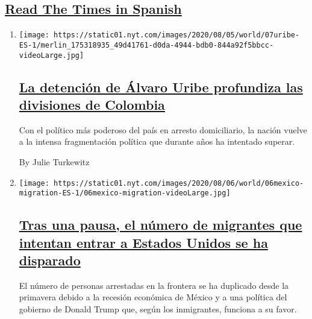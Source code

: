 \hypertarget{read-the-times-in-spanish}{%
\subsection{\texorpdfstring{\protect\hyperlink{}{Read The Times in
Spanish}}{Read The Times in Spanish}}\label{read-the-times-in-spanish}}

\begin{enumerate}
\def\labelenumi{\arabic{enumi}.}
\item
  \texttt{[image: https://static01.nyt.com/images/2020/08/05/world/07uribe-ES-1/merlin\_175318935\_49d41761-d0da-4944-bdb0-844a92f5bbcc-videoLarge.jpg]}

  \hypertarget{la-detenciuxf3n-de-uxe1lvaro-uribe-profundiza-las-divisiones-de-colombia}{%
  \subsection{\texorpdfstring{\href{/es/2020/08/07/espanol/america-latina/alvaro-uribe-colombia.html}{La
  detención de Álvaro Uribe profundiza las divisiones de
  Colombia}}{La detención de Álvaro Uribe profundiza las divisiones de Colombia}}\label{la-detenciuxf3n-de-uxe1lvaro-uribe-profundiza-las-divisiones-de-colombia}}

  Con el político más poderoso del país en arresto domiciliario, la
  nación vuelve a la intensa fragmentación política que durante años ha
  intentado superar.

  By Julie Turkewitz
\item
  \texttt{[image: https://static01.nyt.com/images/2020/08/06/world/06mexico-migration-ES-1/06mexico-migration-videoLarge.jpg]}

  \hypertarget{tras-una-pausa-el-nuxfamero-de-migrantes-que-intentan-entrar-a-estados-unidos-se-ha-disparado}{%
  \subsection{\texorpdfstring{\href{/es/2020/08/06/espanol/america-latina/migracion-estados-unidos.html}{Tras
  una pausa, el número de migrantes que intentan entrar a Estados Unidos
  se ha
  disparado}}{Tras una pausa, el número de migrantes que intentan entrar a Estados Unidos se ha disparado}}\label{tras-una-pausa-el-nuxfamero-de-migrantes-que-intentan-entrar-a-estados-unidos-se-ha-disparado}}

  El número de personas arrestadas en la frontera se ha duplicado desde
  la primavera debido a la recesión económica de México y a una política
  del gobierno de Donald Trump que, según los inmigrantes, funciona a su
  favor.


\end{enumerate}
